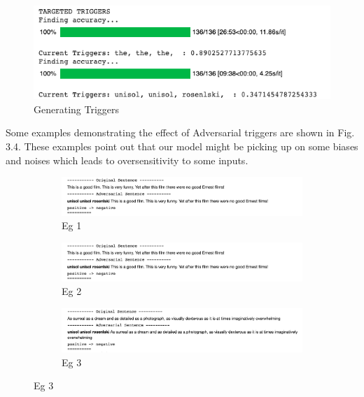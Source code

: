 \documentclass[12pt]{report}
\begin{document}
\begin{spacing}{1.5}
\begin{figure}[!h]
  \centering
  \includegraphics[width=0.8\linewidth]{./img/output/trig.png}
  \caption{Generating Triggers}
  \label{img: trig}
\end{figure}

Some examples demonstrating the effect of Adversarial triggers are shown in Fig. 3.4. These examples point out that our model might be picking up on some biases and noises which leads to oversensitivity to some inputs.

\begin{figure}[h!]
    \label{img: adv_eg}
    \centering
    \begin{subfigure}[t]{\textwidth}
        \centering
        \includegraphics[width=\linewidth]{./img/output/eg_1.png}
        \caption{Eg 1}
        \label{img: eg1}
    \end{subfigure}
    
    \begin{subfigure}[t]{\textwidth}
        \centering
        \includegraphics[width=\linewidth]{./img/output/eg_1.png}
        \caption{Eg 2}
        \label{img: eg2}
    \end{subfigure}%

    \begin{subfigure}[t]{\textwidth}
        \centering
        \includegraphics[width=\linewidth]{./img/output/eg_3.png}
        \caption{Eg 3}
        \label{img: eg3}
    \end{subfigure}%


\end{figure}
\end{spacing}
\end{document}
